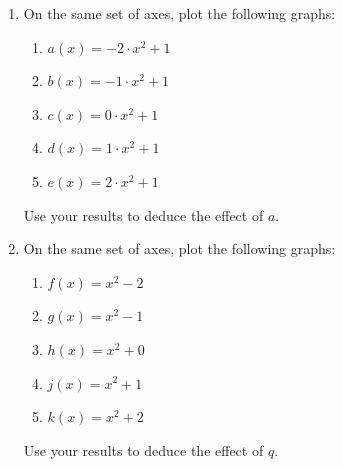 \label{m39345*secfhsst!!!underscore!!!id1384}
\nopagebreak
\label{m39345*id240398}\begin{enumerate}[noitemsep, label=\textbf{\arabic*}. ] 
\label{m39345*uid103}\item On the same set of axes, plot the following graphs:
\label{m39345*id240413}\begin{enumerate}[noitemsep, label=\textbf{\alph*}. ] 
\label{m39345*uid104}\item $a\left(x\right)=-2\ensuremath{\cdot}{x}^{2}+1$\label{m39345*uid105}\item $b\left(x\right)=-1\ensuremath{\cdot}{x}^{2}+1$\label{m39345*uid106}\item $c\left(x\right)=0\ensuremath{\cdot}{x}^{2}+1$\label{m39345*uid107}\item $d\left(x\right)=1\ensuremath{\cdot}{x}^{2}+1$\label{m39345*uid108}\item $e\left(x\right)=2\ensuremath{\cdot}{x}^{2}+1$\end{enumerate}
Use your results to deduce the effect of $a$.
\label{m39345*uid109}\item On the same set of axes, plot the following graphs:
\label{m39345*id240675}\begin{enumerate}[noitemsep, label=\textbf{\alph*}. ] 
\label{m39345*uid110}\item $f\left(x\right)={x}^{2}-2$\label{m39345*uid111}\item $g\left(x\right)={x}^{2}-1$\label{m39345*uid112}\item $h\left(x\right)={x}^{2}+0$\label{m39345*uid113}\item $j\left(x\right)={x}^{2}+1$\label{m39345*uid114}\item $k\left(x\right)={x}^{2}+2$\end{enumerate}
Use your results to deduce the effect of $q$.
\end{enumerate}
